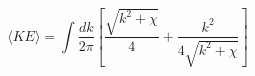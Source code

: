 \begin{equation}
\langle KE \rangle = \int \frac{dk} {2 \pi} [ \frac {\sqrt{k^2+\chi}}{4} +
\frac{k^2} {4 \sqrt{k^2+\chi}} ] \end{equation}

